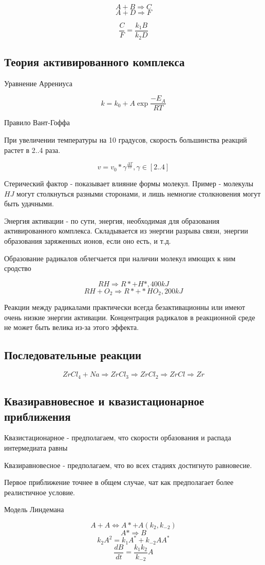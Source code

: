 \documentclass[11pt]{article}
\begin{document}
 $$A + B \Rightarrow C$$
$$A + D \Rightarrow F$$

$$\frac{C}{F} = \frac{k_1B}{k_2D}$$

\subsection{Теория активированного комплекса}

Уравнение Аррениуса

$$k = k_0 +A\exp{\frac{-E_A}{RT}}$$

Правило Вант-Гоффа

При увеличении температуры на 10 градусов, скорость большинства реакций растет в 2..4 раза. 

$$v = v_0*\gamma^{\frac{\Delta T}{10}}, \gamma \in [2..4]$$

Стерический фактор - показывает влияние формы молекул. Пример - молекулы $HJ$ могут столкнуться разными сторонами, и лишь немногие столкновения могут быть удачными.

Энергия активации - по сути, энергия, необходимая для образования активированного комплекса. Складывается из энергии разрыва связи, энергии образования заряженных ионов, если оно есть, и т.д.

Образование радикалов облегчается при наличии молекул имющих к ним сродство

$$RH \Rightarrow R* + H*, 400 kJ$$
$$RH + O_2 \Rightarrow R* + *HO_2, 200 kJ$$

Реакции между радикалами практически всегда безактивационны или имеют очень низкие энергии активации. Концентрация радикалов в реакционной среде не может быть велика из-за этого эффекта.

\subsection{Последовательные реакции}

$$ZrCl_4 + Na \Rightarrow ZrCl_3 \Rightarrow ZrCl_2 \Rightarrow ZrCl \Rightarrow Zr  $$


\subsection{Квазиравновесное и квазистационарное приближения}

Квазистационарное - предполагаем, что скорости орбазования и распада интермедиата равны

Квазиравновесное - предполагаем, что во всех стадиях достигнуто равновесие.

Первое приближение точнее в общем случае, чат как предполагает более реалистичное условие.

Модель Линдемана

$$A + A \Leftrightarrow A* + A (k_2, k_{-2})$$
$$A* \Rightarrow B$$
$$k_2 A^2 = k_1A^* + k_{-2}AA^*$$
$$\frac{dB}{dt} = \frac{k_1k_2}{k_{-2}}A$$
\end{document}

